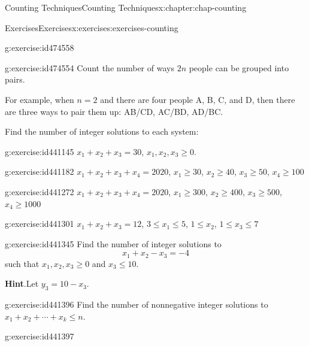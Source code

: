 \documentclass[oneside,10pt,]{book}
\newcommand{\blocktitlefont}{\relax}
\numberwithin{equation}{section}
\begin{document}
\begin{chapterptx}{Counting Techniques}{}{Counting Techniques}{}{}{x:chapter:chap-counting}
\begin{exercises-section}{Exercises}{}{Exercises}{}{}{x:exercises:exercises-counting}
\begin{divisionexercise}{17}{}{}{g:exercise:id474558}
\end{divisionexercise}%
\begin{divisionexercise}{18}{}{}{g:exercise:id474554}%
Count the number of ways \(2n\) people can be grouped into pairs.%
\par
For example, when \(n = 2\) and there are four people A, B, C, and D, then there are three ways to pair them up: AB\slash{}CD, AC\slash{}BD, AD\slash{}BC.%
\end{divisionexercise}%
\par\medskip\noindent%
%
Find the number of integer solutions to each system:%
\begin{exercisegroup}
\begin{divisionexerciseeg}{19}{}{}{g:exercise:id441145}%
\(x_1 + x_2 + x_3 = 30\), \(x_1, x_2, x_3 \geq 0\).%
\end{divisionexerciseeg}%
\begin{divisionexerciseeg}{20}{}{}{g:exercise:id441182}%
\(x_1 + x_2 + x_3 + x_4 = 2020\), \(x_1 \geq 30\), \(x_2 \geq 40\), \(x_3 \geq 50\), \(x_4 \geq 100\)%
\end{divisionexerciseeg}%
\begin{divisionexerciseeg}{21}{}{}{g:exercise:id441272}%
\(x_1 + x_2 + x_3 + x_4 = 2020\), \(x_1 \geq 300\), \(x_2 \geq 400\), \(x_3 \geq 500\), \(x_4 \geq 1000\)%
\end{divisionexerciseeg}%
\begin{divisionexerciseeg}{22}{}{}{g:exercise:id441301}%
\(x_1 + x_2 + x_3 = 12\), \(3 \leq x_1 \leq 5\), \(1 \leq x_2\), \(1 \leq x_3 \leq 7\)%
\end{divisionexerciseeg}%
\end{exercisegroup}
\par\medskip\noindent
\begin{divisionexercise}{23}{}{}{g:exercise:id441345}%
Find the number of integer solutions to%
\begin{equation*}
x_1 + x_2 - x_3 = -4
\end{equation*}
such that \(x_1, x_2, x_3 \geq 0\) and \(x_3 \leq 10\).%
\par\smallskip%
\noindent\textbf{\blocktitlefont Hint}.\hypertarget{g:hint:id441348}{}\quad{}Let \(y_3 = 10 - x_3\).%
\end{divisionexercise}%
\begin{divisionexercise}{24}{}{}{g:exercise:id441396}%
Find the number of nonnegative integer solutions to \(x_1 + x_2 + \cdots + x_k \leq n\).%
\end{divisionexercise}%
\begin{divisionexercise}{25}{}{}{g:exercise:id441397}%

\end{divisionexercise}
\end{exercises-section}
\end{chapterptx}
\end{document}

